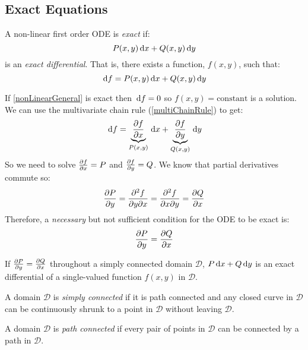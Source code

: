 \documentclass[../main.tex]{subfiles}
\begin{document}
\subsection{Exact Equations}
\begin{definition}[Exact]
  A non-linear first order ODE is \textit{exact} if:
  \[
    P(x, y)\,\mathrm{d} x + Q(x, y)\,\mathrm{d} y
  \]
  is an \textit{exact differential}.
  That is, there exists a function, $f(x, y)$, such that:
  \[
    \,\mathrm{d} f = P(x, y)\,\mathrm{d} x + Q(x, y)\,\mathrm{d} y
  \]
\end{definition}
If \cref{nonLinearGeneral} is exact then $\,\mathrm{d} f = 0$ so $f(x, y) = \text{constant}$ is a solution.
We can use the multivariate chain rule (\cref{multiChainRule}) to get:
\[
  \d{f} = \underbrace{\pderiv{f}{x}}_{P(x, y)} \d{x} + \underbrace{\pderiv{f}{y}}_{Q(x, y)} \d{y}
\]
So we need to solve $\pderiv{f}{x} = P$ and $\pderiv{f}{y} = Q$.
We know that partial derivatives commute so:
\[
  \pderiv{P}{y} = \frac{\partial^2 f}{\partial y \partial x} = \frac{\partial^2 f}{\partial x \partial y} = \pderiv{Q}{x}
\]
Therefore, a \textit{necessary} but not sufficient condition for the ODE to be exact is:
\[
  \pderiv{P}{y} = \pderiv{Q}{x}
\]
\begin{theorem}
  If $\pderiv{P}{y} = \pderiv{Q}{x}$ throughout a simply connected domain $\mathcal{D}$, $P\,\mathrm{d} x + Q\,\mathrm{d} y$ is an exact differential of a single-valued function $f(x, y)$ in $\mathcal{D}$.
\end{theorem}
\begin{definition}
  A domain $\mathcal{D}$ is \textit{simply connected} if it is path connected and any closed curve in $\mathcal{D}$ can be continuously shrunk to a point in $\mathcal{D}$ without leaving $\mathcal{D}$.
\end{definition}
\begin{definition}
  A domain $\mathcal{D}$  is \textit{path connected} if every pair of points in $\mathcal{D}$ can be connected by a path in $\mathcal{D}$.
\end{definition}
\end{document}
